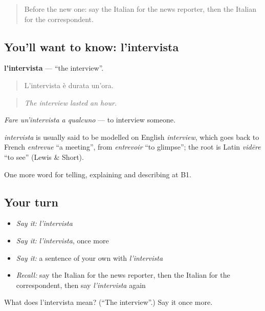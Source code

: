 \begin{quote}
Before the new one: say the Italian for the news reporter, then the Italian for the correspondent.
\end{quote}

\subsection*{You'll want to know: l'intervista}
\textbf{l'intervista} — \textquotedblleft{}the interview\textquotedblright{}.

\begin{quote}
L'intervista è durata un'ora.
\end{quote}

\begin{quote}
\emph{The interview lasted an hour.}
\end{quote}

\emph{Fare un'intervista a qualcuno} — to interview someone.

\begin{cousinweb}
\emph{intervista} is usually said to be modelled on English \emph{interview}, which goes back to French \emph{entrevue} \textquotedblleft{}a meeting\textquotedblright{}, from \emph{entrevoir} \textquotedblleft{}to glimpse\textquotedblright{}; the root is Latin \emph{vidēre} \textquotedblleft{}to see\textquotedblright{} (Lewis \& Short).
\end{cousinweb}

\begin{grammarlens}[title={What you've built}]
One more word for telling, explaining and describing at B1.
\end{grammarlens}

\subsection*{Your turn}
\begin{itemize}
\raggedright
  \item \emph{Say it:} \emph{l'intervista}
  \item \emph{Say it:} \emph{l'intervista}, once more
  \item \emph{Say it:} a sentence of your own with \emph{l'intervista}
  \item \emph{Recall:} say the Italian for the news reporter, then the Italian for the correspondent, then say \emph{l'intervista} again
\end{itemize}

\begin{tcolorbox}[breakable,colback=teal!4,colframe=teal!35!black,title={Before you move on}]
What does l'intervista mean? (\textquotedblleft{}The interview\textquotedblright{}.) Say it once more.
\end{tcolorbox}
